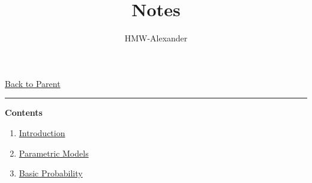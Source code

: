 \documentclass[letterpaper,11pt]{article}
\title{\textbf{Notes}}
\author{HMW-Alexander}
\newcommand{\panhline}{\begin{center}\rule{\textwidth}{1pt}\end{center}}
\begin{document}
\maketitle
\href{../index.html}{Back to Parent}

\panhline
\textbf{Contents}

\begin{enumerate}
	\item \href{./01_Introduction/document.html}{Introduction}
	\item \href{./02_ParametricModels/document.html}{Parametric Models}
	\item \href{./R1_BasicProbability/document.html}{Basic Probability}
\end{enumerate}
\end{document}
